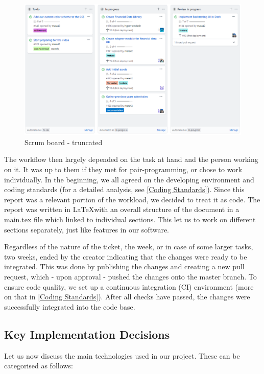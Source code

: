 \documentclass[main.tex]{subfiles}
\begin{document}
\begin{figure}[H]
   \centering
   \includegraphics[width=\textwidth]{05Coding/05Pictures/scrumboard.png}
   \caption{Scrum board - truncated}
   \label{Scrum}
\end{figure}

The workflow then largely depended on the task at hand and the person working on it. It was up to them if they met for pair-programming, or chose to work individually. In the beginning, we all agreed on the developing environment and coding standards (for a detailed analysis, see \ref{Coding Standards}). Since this report was a relevant portion of the workload, we decided to treat it as code. The report was written in \LaTeX with an overall structure of the document in a main.tex file which linked to individual sections. This let us to work on different sections separately, just like features in our software.

Regardless of the nature of the ticket, the week, or in case of some larger tasks, two weeks, ended by the creator indicating that the changes were ready to be integrated. This was done by publishing the changes and creating a new pull request, which - upon approval - pushed the changes onto the master branch. To ensure code quality, we set up a continuous integration (CI) environment (more on that in \ref{Coding Standards}). After all checks have passed, the changes were successfully integrated into the code base.

\subsection{Key Implementation Decisions}

Let us now discuss the main technologies used in our project. These can be categorised as follows:
\end{document}
